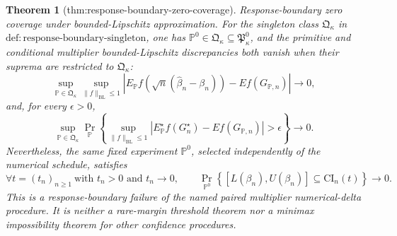 \documentclass{article}
\newtheorem{theorem}{Theorem}
\begin{document}
\begin{theorem}[thm:response-boundary-zero-coverage]\label{thm:response-boundary-zero-coverage}
Response-boundary zero coverage under bounded-Lipschitz approximation.  For the singleton class \(\mathfrak Q_{\kappa}\) in \(\mathrm{def:response\text{-}boundary\text{-}singleton}\), one has \(\mathbb P^0\in\mathfrak Q_{\kappa}\subseteq\mathfrak P_{\kappa}^{0}\), and the primitive and conditional multiplier bounded-Lipschitz discrepancies both vanish when their suprema are restricted to \(\mathfrak Q_{\kappa}\):
\[
\sup_{\mathbb P\in\mathfrak Q_{\kappa}}
\sup_{\lVert f\rVert_{\mathrm{BL}}\leq1}
\left|
E_{\mathbb P}f\!\left(\sqrt n(\widehat\beta_n-\beta_n)\right)
-E f(G_{\mathbb P,n})
\right|\longrightarrow0,
\]
and, for every \(\epsilon>0\),
\[
\sup_{\mathbb P\in\mathfrak Q_{\kappa}}
\Pr_{\mathbb P}\!\left\{
\sup_{\lVert f\rVert_{\mathrm{BL}}\leq1}
\left|E_{\mathbb P}^{\star}f(G_n^\star)-E f(G_{\mathbb P,n})\right|>\epsilon
\right\}\longrightarrow0.
\]
Nevertheless, the same fixed experiment \(\mathbb P^0\), selected independently of the numerical schedule, satisfies
\[
\forall t=(t_n)_{n\geq1}\ \text{with }t_n>0\text{ and }t_n\to0,
\qquad
\Pr_{\mathbb P^0}\!\left\{
[L(\beta_n),U(\beta_n)]\subseteq\mathrm{CI}_n(t)
\right\}\longrightarrow0.
\]
This is a response-boundary failure of the named paired multiplier numerical-delta procedure.  It is neither a rare-margin threshold theorem nor a minimax impossibility theorem for other confidence procedures.
\end{theorem}
\end{document}
